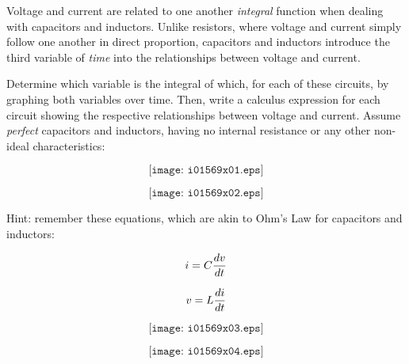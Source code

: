 

Voltage and current are related to one another {\it integral} function when dealing with capacitors and inductors.  Unlike resistors, where voltage and current simply follow one another in direct proportion, capacitors and inductors introduce the third variable of {\it time} into the relationships between voltage and current.

Determine which variable is the integral of which, for each of these circuits, by graphing both variables over time.  Then, write a calculus expression for each circuit showing the respective relationships between voltage and current.  Assume {\it perfect} capacitors and inductors, having no internal resistance or any other non-ideal characteristics:
 
$$\texttt{[image: i01569x01.eps]}$$

$$\texttt{[image: i01569x02.eps]}$$

Hint: remember these equations, which are akin to Ohm's Law for capacitors and inductors:

$$i = C {dv \over dt}$$

$$v = L {di \over dt}$$







$$\texttt{[image: i01569x03.eps]}$$

$$\texttt{[image: i01569x04.eps]}$$













